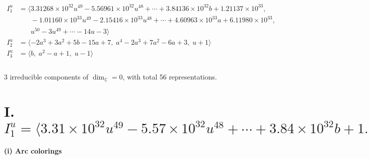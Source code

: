 \documentclass[1p]{elsarticle_modified}
\theoremstyle{definition}
\begin{document}
\begin{align*}
I^u_{1}&=\langle 
3.31268\times10^{32} u^{49}-5.56961\times10^{32} u^{48}+\cdots+3.84136\times10^{32} b+1.21137\times10^{33},\\
\phantom{I^u_{1}}&\phantom{= \langle  }-1.01160\times10^{33} u^{49}-2.15416\times10^{33} u^{48}+\cdots+4.60963\times10^{33} a+6.11980\times10^{33},\\
\phantom{I^u_{1}}&\phantom{= \langle  }u^{50}-3 u^{49}+\cdots-14 u-3\rangle \\
I^u_{2}&=\langle 
-2 a^3+3 a^2+5 b-15 a+7,\;a^4-2 a^3+7 a^2-6 a+3,\;u+1\rangle \\
I^u_{3}&=\langle 
b,\;a^2- a+1,\;u-1\rangle \\
\\
\end{align*}
\raggedright * 3 irreducible components of $\dim_{\mathbb{C}}=0$, with total 56 representations.\\
\newpage
\renewcommand{\arraystretch}{1}
\centering \section*{I. $I^u_{1}= \langle 3.31\times10^{32} u^{49}-5.57\times10^{32} u^{48}+\cdots+3.84\times10^{32} b+1.21\times10^{33},\;-1.01\times10^{33} u^{49}-2.15\times10^{33} u^{48}+\cdots+4.61\times10^{33} a+6.12\times10^{33},\;u^{50}-3 u^{49}+\cdots-14 u-3 \rangle$}
\flushleft \textbf{(i) Arc colorings}\\
\end{document}
